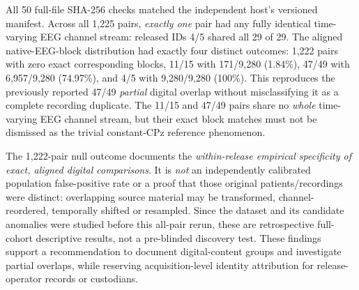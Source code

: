 All 50 full-file SHA-256 checks matched the independent
host's versioned manifest. Across all 1,225 pairs,
\emph{exactly one} pair had any fully identical
time-varying EEG channel stream: released IDs 4/5
shared all 29 of 29. The aligned native-EEG-block
distribution had exactly four distinct outcomes:
1,222 pairs with zero exact corresponding blocks,
11/15 with 171/9,280 (1.84\%), 47/49 with
6,957/9,280 (74.97\%), and 4/5 with 9,280/9,280
(100\%). This reproduces the previously reported
47/49 \emph{partial} digital overlap without
misclassifying it as a complete recording duplicate.
The 11/15 and 47/49 pairs share no \emph{whole}
time-varying EEG channel stream, but their exact block
matches must not be dismissed as the trivial
constant-CPz reference phenomenon.

The 1,222-pair null outcome documents the \emph{within-release
empirical specificity of exact, aligned digital comparisons}.
It is \emph{not} an independently calibrated population
false-positive rate or a proof that those original
patients/recordings were distinct: overlapping
source material may be transformed, channel-reordered,
temporally shifted or resampled. Since the dataset
and its candidate anomalies were studied before this
all-pair rerun, these are retrospective full-cohort
descriptive results, not a pre-blinded discovery test.
These findings support a recommendation to document
digital-content groups and investigate partial overlaps,
while reserving acquisition-level identity
attribution for release-operator records or custodians.

